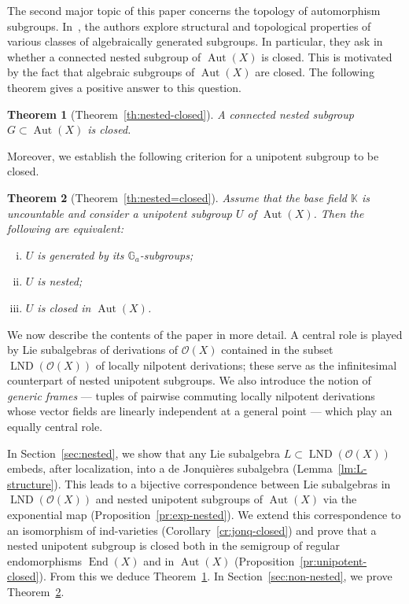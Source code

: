 \documentclass[12pt,a4paper]{amsart}
\theoremstyle{plain}
\newtheorem{theorem}{Theorem}[section]
\theoremstyle{definition}
\theoremstyle{remark}
\def\Aut{\operatorname{Aut}}
\def\End{\operatorname{End}}
\def\LND{\operatorname{LND}}
\def\K{{\mathbb K}}
\def\G{{\mathbb G}}
\def\cO{{\mathcal O}}
\begin{document}
The second major topic of this paper concerns the topology of automorphism subgroups.
In~\cite{KZ}, the authors explore structural and topological properties of various classes of algebraically generated subgroups. 
In particular, they ask in~\cite[Question 4]{KZ} whether a connected nested subgroup of $\Aut(X)$ is closed. 
This is motivated by the fact that algebraic subgroups of $\Aut(X)$ are closed.
The following theorem gives a positive answer to this question.

\begin{theorem}[{Theorem~\ref{th:nested-closed}}] \label{th:nested-closed-intro}
   A connected nested subgroup $G\subset\Aut(X)$ is closed.
\end{theorem}

Moreover, we establish the following criterion for a unipotent subgroup to be closed.

\begin{theorem}[{Theorem~\ref{th:nested=closed}}] \label{th:nested=closed-intro}
  Assume that the base field $\K$ is uncountable and consider a unipotent subgroup $U$ of $\Aut(X)$. Then the following are equivalent:
   \begin{enumerate}[(i)]
      \item $U$ is generated by its $\G_a$-subgroups;
      \item $U$ is nested;
      \item $U$ is closed in $\Aut(X)$.
   \end{enumerate}
\end{theorem}

 


We now describe the contents of the paper in more detail.
A central role is played by Lie subalgebras of derivations of $\cO(X)$ contained in the subset $\LND(\cO(X))$ of locally nilpotent derivations; these serve as the infinitesimal counterpart of nested unipotent subgroups.
We also introduce the notion of \emph{generic frames} --- tuples of pairwise commuting locally nilpotent derivations whose vector fields are linearly independent at a general point --- which play an equally central role.

In Section~\ref{sec:nested}, we show that any Lie subalgebra $L\subset\LND(\cO(X))$ embeds, after localization, into a de Jonqui\`eres subalgebra (Lemma~\ref{lm:L-structure}).
This leads to a bijective correspondence between Lie subalgebras in $\LND(\cO(X))$ and nested unipotent subgroups of $\Aut(X)$ via the exponential map (Proposition~\ref{pr:exp-nested}).
We extend this correspondence to an isomorphism of ind-varieties (Corollary~\ref{cr:jonq-closed}) and prove that a nested unipotent subgroup is closed both in the semigroup of regular endomorphisms $\End(X)$ and in $\Aut(X)$ (Proposition~\ref{pr:unipotent-closed}).
From this we deduce Theorem~\ref{th:nested-closed-intro}.
 In Section~\ref{sec:non-nested}, we prove Theorem~\ref{th:nested=closed-intro}.
\end{document}
